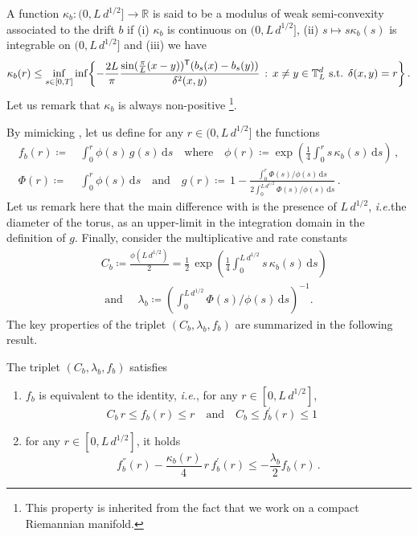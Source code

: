 \documentclass[final,12pt]{colt2023} %
\def\ie{\textit{i.e.}}
\newcommand{\bes}{\begin{equation}}
\newcommand{\ees}{\end{equation}}
\newcommand{\De}{\mathrm{d}}
\def\ie{\textit{i.e.}}
\begin{document}
\begin{definition}\label{app:new:def:kappa} A function $\kappa_b: (0,L\,d^{1/2}] \to \mathbb{R}$ is said to be a modulus of weak semi-convexity associated to the drift $b$ if (i) $\kappa_b$ is continuous on $(0, L\,d^{1/2}]$, (ii) $s \mapsto s \kappa_b(s)$ is integrable on $(0, L \, d^{1/2}]$ and (iii) we have
\bes
    \kappa_b(r)\leq\inf_{s\in[0,T]}\inf\biggl\{-\frac{2L}{\pi}\frac{\sin(\frac{\pi}{L}(x-y))^{{\sf  T}}(b_s(x)-b_s(y))}{\delta^2(x,y)}\,:\,x\neq y\in\mathbb{T}_L^d\text{ s.t. }\delta(x,y)=r \biggr\}\,.
\ees
Let us remark that $\kappa_b$ is always non-positive \footnote{This property is inherited from the fact that we work on a compact Riemannian manifold.}.
\end{definition}
 By mimicking \citep{wang1994neumann,eberle2016reflection}, let us define for any $r\in(0,L \, d^{1/2}]$ the functions 
\begin{equation}
\begin{split}\label{def:f}
f_b(r)\coloneqq&\, \int_0^r\phi(s)\,g(s)\,\De s\quad\text{where}\quad
\phi(r)\coloneqq \exp\left(\frac14\int_0^r s\,\kappa_b(s)\,\De s\right)\,,\\\Phi(r)\coloneqq &\,\int_0^r\phi(s)\,\De s\quad\text{and}\quad
g(r)\coloneqq\, 1-\frac{\int_0^{r}\Phi(s)/\phi(s)\,\De s}{2\int_0^{L\,d^{1/2}}\Phi(s)/\phi(s)\,\De s}\,.
\end{split}
\end{equation}
Let us remark here that the main difference with \citep{eberle2016reflection} is the presence of $L\,d^{1/2}$, \ie the diameter of the torus, as an upper-limit in the integration domain in the definition of $g$. 
Finally, consider the multiplicative and rate constants
\begin{equation}\label{def:lambda:C}
\begin{split}
&\,C_b\coloneqq \frac{\phi( L \, d^{1/2})}{2}=\frac{1}{2}\,\exp\left(\frac14\int_0^{L\,d^{1/2}} s\,\kappa_b(s)\,\De s\right)\\
&\,\text{ and }\quad\lambda_b\coloneqq \left(\int_0^{L \, d^{1/2}}\Phi(s)/\phi(s)\,\De s\right)^{-1}.
\end{split}
\end{equation}
The key properties of the triplet $(C_b,\lambda_b,f_b)$ are summarized in the following result.
\begin{proposition}\label{app:costruzione:f}
The triplet $(C_b,\lambda_b,f_b)$ satisfies
\begin{enumerate}
\item $f_b$ is equivalent to the identity, \ie, for any $ r\in[0,L \, d^{1/2}]$,
\bes C_b\,r\leq f_b(r)\leq r\quad\text{and}\quad C_b\leq f_b^{'}(r)\leq 1\quad \, \ees
\item for any $r\in[0,L\,d^{1/2}]$, it holds
\begin{equation}\label{eq:diff:f}
f^{''}_b(r)-\frac{\kappa_b(r)}{4}\,r\,f^{'}_b(r)\leq -\frac{\lambda_b}{2}f_b(r)\,.
\end{equation}
\end{enumerate}
\end{proposition}
\end{document}
